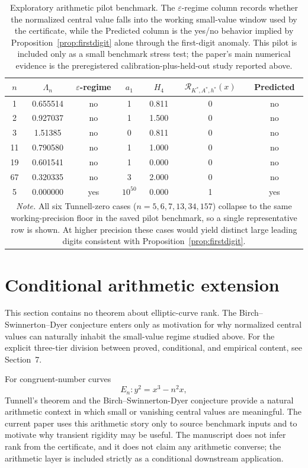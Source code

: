 \documentclass[11pt]{article}
\begin{document}
\begin{table}[t]
\centering
\scriptsize
\begin{tabular}{ccccccc}
\toprule
$n$ & $\Lambda_n$ & $\varepsilon$-regime & $a_1$ & $H_4$ & $\mathcal{R}_{K^*,A^*,h^*}(x)$ & Predicted \\
\midrule
1   & 0.655514 & no  & 1        & 0.811 & 0 & no  \\
2   & 0.927037 & no  & 1        & 1.500 & 0 & no  \\
3   & 1.51385  & no  & 0        & 0.811 & 0 & no  \\
11  & 0.790580 & no  & 1        & 1.000 & 0 & no  \\
19  & 0.601541 & no  & 1        & 0.000 & 0 & no  \\
67  & 0.320335 & no  & 3        & 2.000 & 0 & no  \\
5   & 0.000000 & yes & $10^{50}$ & 0.000 & 1 & yes \\
\bottomrule
\multicolumn{7}{p{0.9\linewidth}}{\footnotesize \emph{Note.} All six Tunnell-zero cases ($n=5,6,7,13,34,157$) collapse to the same working-precision floor in the saved pilot benchmark, so a single representative row is shown. At higher precision these cases would yield distinct large leading digits consistent with Proposition~\ref{prop:firstdigit}.}
\end{tabular}
\caption{Exploratory arithmetic pilot benchmark. The $\varepsilon$-regime column records whether the normalized central value falls into the working small-value window used by the certificate, while the Predicted column is the yes/no behavior implied by Proposition~\ref{prop:firstdigit} alone through the first-digit anomaly. This pilot is included only as a small benchmark stress test; the paper's main numerical evidence is the preregistered calibration-plus-held-out study reported above.}
\end{table}

\section{Conditional arithmetic extension}

This section contains no theorem about elliptic-curve rank. The Birch--Swinnerton--Dyer conjecture enters only as motivation for why normalized central values can naturally inhabit the small-value regime studied above. For the explicit three-tier division between proved, conditional, and empirical content, see Section~7.

For congruent-number curves
\[
E_n: y^2=x^3-n^2x,
\]
Tunnell's theorem and the Birch--Swinnerton-Dyer conjecture provide a natural arithmetic context in which small or vanishing central values are meaningful. The current paper uses this arithmetic story only to source benchmark inputs and to motivate why transient rigidity may be useful. The manuscript does not infer rank from the certificate, and it does not claim any arithmetic converse; the arithmetic layer is included strictly as a conditional downstream application.
\end{document}
